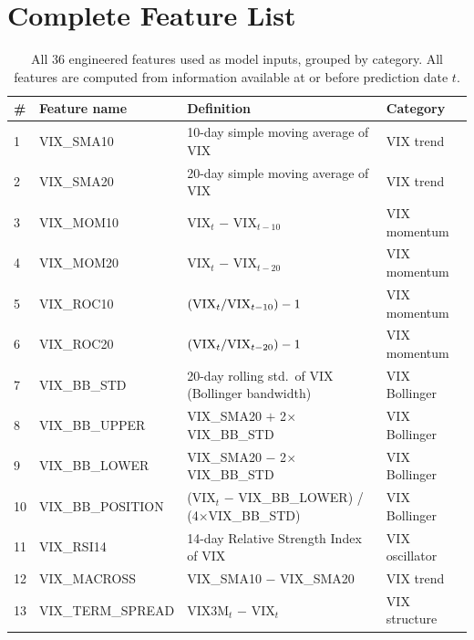 \documentclass[12pt]{article}
\begin{document}
\appendix
\section{Complete Feature List}
\label{app:features}

\begin{table}[H]
\centering
\caption{All 36 engineered features used as model inputs, grouped by category. All features are computed from information available at or before prediction date $t$.}
\label{tab:features}
\small
\begin{tabular}{llll}
\toprule
\# & Feature name & Definition & Category \\
\midrule
1  & VIX\_SMA10        & 10-day simple moving average of VIX                        & VIX trend \\
2  & VIX\_SMA20        & 20-day simple moving average of VIX                        & VIX trend \\
3  & VIX\_MOM10        & VIX$_t$ $-$ VIX$_{t-10}$                                  & VIX momentum \\
4  & VIX\_MOM20        & VIX$_t$ $-$ VIX$_{t-20}$                                  & VIX momentum \\
5  & VIX\_ROC10        & $({\rm VIX}_t / {\rm VIX}_{t-10}) - 1$                     & VIX momentum \\
6  & VIX\_ROC20        & $({\rm VIX}_t / {\rm VIX}_{t-20}) - 1$                     & VIX momentum \\
7  & VIX\_BB\_STD      & 20-day rolling std.\ of VIX (Bollinger bandwidth)          & VIX Bollinger \\
8  & VIX\_BB\_UPPER    & VIX\_SMA20 $+$ 2$\times$VIX\_BB\_STD                       & VIX Bollinger \\
9  & VIX\_BB\_LOWER    & VIX\_SMA20 $-$ 2$\times$VIX\_BB\_STD                       & VIX Bollinger \\
10 & VIX\_BB\_POSITION & (VIX$_t$ $-$ VIX\_BB\_LOWER) / (4$\times$VIX\_BB\_STD)    & VIX Bollinger \\
11 & VIX\_RSI14        & 14-day Relative Strength Index of VIX                      & VIX oscillator \\
12 & VIX\_MACROSS      & VIX\_SMA10 $-$ VIX\_SMA20                                  & VIX trend \\
13 & VIX\_TERM\_SPREAD & VIX3M$_t$ $-$ VIX$_t$                                      & VIX structure \\

\end{tabular}
\end{table}
\end{document}

